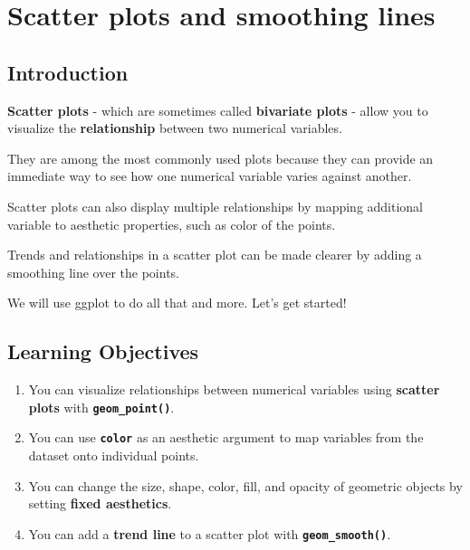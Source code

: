 \documentclass[
  letterpaper,
  DIV=11,
  numbers=noendperiod]{scrreprt}
\providecommand{\tightlist}{%
  \setlength{\itemsep}{0pt}\setlength{\parskip}{0pt}}\usepackage{longtable,booktabs,array}
\begin{document}

\hypertarget{scatter-plots-and-smoothing-lines}{%
\chapter{Scatter plots and smoothing
lines}\label{scatter-plots-and-smoothing-lines}}

\hypertarget{introduction-14}{%
\section{Introduction}\label{introduction-14}}

\textbf{Scatter plots} - which are sometimes called \textbf{bivariate
plots} - allow you to visualize the \textbf{relationship} between two
numerical variables.

They are among the most commonly used plots because they can provide an
immediate way to see how one numerical variable varies against another.

Scatter plots can also display multiple relationships by mapping
additional variable to aesthetic properties, such as color of the
points.

Trends and relationships in a scatter plot can be made clearer by adding
a smoothing line over the points.

We will use ggplot to do all that and more. Let's get started!

\hypertarget{learning-objectives-15}{%
\section{Learning Objectives}\label{learning-objectives-15}}

\begin{enumerate}
\def\labelenumi{\arabic{enumi}.}
\tightlist
\item
  You can visualize relationships between numerical variables using
  \textbf{scatter plots} with \textbf{\texttt{geom\_point()}}.
\item
  You can use \textbf{\texttt{color}} as an aesthetic argument to map
  variables from the dataset onto individual points.
\item
  You can change the size, shape, color, fill, and opacity of geometric
  objects by setting \textbf{fixed aesthetics}.
\item
  You can add a \textbf{trend line} to a scatter plot with
  \textbf{\texttt{geom\_smooth()}}.
\end{enumerate}
\end{document}
